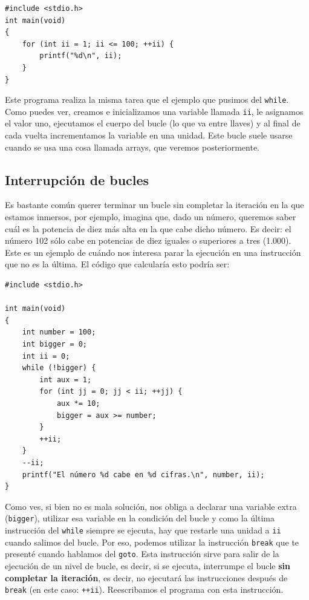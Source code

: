 \documentclass[a4paper]{article}
\begin{document}
\noindent
\begin{minipage}[H]{\linewidth}
\mbox{}
\begin{lstlisting}[style=C,
caption={Ejemplo de programa con un bucle \texttt{for}},
label={lst:forStructure}]
#include <stdio.h>
int main(void)
{
    for (int ii = 1; ii <= 100; ++ii) {
        printf("%d\n", ii);
    }
}
\end{lstlisting}
\end{minipage}


Este programa realiza la misma tarea que el ejemplo que pusimos del
\texttt{while}. Como puedes ver, creamos e inicializamos una variable llamada
\texttt{ii}, le asignamos el valor uno, ejecutamos el cuerpo del bucle (lo que
va entre llaves) y al final de cada vuelta incrementamos la variable en
una unidad. Este
bucle suele usarse cuando se usa una cosa llamada arrays, que
veremos posteriormente.

\subsection{Interrupción de bucles}
Es bastante común querer terminar un bucle sin completar la iteración en la que
estamos inmersos, por ejemplo, imagina que, dado un número, queremos
saber cuál es la potencia de diez más alta en la que cabe dicho número. Es
decir: el número 102 sólo cabe en potencias de diez iguales o superiores a tres
(1.000). Este es un ejemplo de cuándo nos interesa parar la ejecución en una
instrucción que no es la última. El código que calcularía esto podría ser:

\noindent
\begin{minipage}[H]{\linewidth}
\mbox{}
\begin{lstlisting}[style=C,
caption={Ejemplo de interrupción de un bucle con una variable auxiliar},
label={lst:loopInterruption}]
#include <stdio.h>

int main(void)
{
    int number = 100;
    int bigger = 0;
    int ii = 0;
    while (!bigger) {
        int aux = 1;
        for (int jj = 0; jj < ii; ++jj) {
            aux *= 10;
            bigger = aux >= number;
        }
        ++ii;
    }
    --ii;
    printf("El número %d cabe en %d cifras.\n", number, ii);
}
\end{lstlisting}
\end{minipage}

Como ves, si bien no es mala solución, nos obliga a declarar una variable
extra (\verb!bigger!),
utilizar esa variable en la condición del bucle y como la última instrucción del
\verb!while! siempre se ejecuta, hay que restarle una unidad a \verb!ii! cuando
salimos del bucle. Por eso, podemos utilizar
la instrucción \verb!break! que te presenté cuando hablamos del \verb!goto!.
Esta instrucción sirve para salir de la ejecución de un nivel de bucle, es decir,
si se ejecuta, interrumpe el bucle \textbf{sin completar la iteración}, es
decir, no ejecutará las instrucciones después de \verb!break!
(en este caso: \verb!++ii!).
Reescribamos el programa con esta instrucción.
\end{document}
